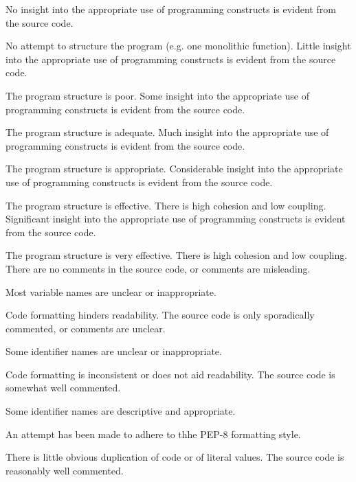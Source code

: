 \documentclass{../../fal_assignment}
\begin{document}
\begin{markingrubric}
%
        \grade\fail No insight into the appropriate use of programming constructs is evident from the source code.
            \par No attempt to structure the program (e.g. one monolithic function).
        \grade Little insight into the appropriate use of programming constructs is evident from the source code.
            \par The program structure is poor.
        \grade Some insight into the appropriate use of programming constructs is evident from the source code.
            \par The program structure is adequate.
        \grade Much insight into the appropriate use of programming constructs is evident from the source code.
            \par The program structure is appropriate.
        \grade Considerable insight into the appropriate use of programming constructs is evident from the source code.
            \par The program structure is effective. There is high cohesion and low coupling.
        \grade Significant insight into the appropriate use of programming constructs is evident from the source code.
            \par The program structure is very effective. There is high cohesion and low coupling.
%
        \grade\fail There are no comments in the source code, or comments are misleading.
            \par Most variable names are unclear or inappropriate.
            \par Code formatting hinders readability.
        \grade The source code is only sporadically commented, or comments are unclear.
            \par Some identifier names are unclear or inappropriate.
            \par Code formatting is inconsistent or does not aid readability.
        \grade The source code is somewhat well commented.
            \par Some identifier names are descriptive and appropriate.
            \par An attempt has been made to adhere to thhe PEP-8 formatting style.
             \par There is little obvious duplication of code or of literal values.           
        \grade The source code is reasonably well commented.

\end{markingrubric}
\end{document}
